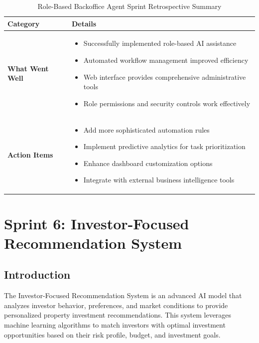 \begin{table}[htbp]
    \centering
    \begin{tabular}{|p{3cm}|p{10cm}|}
        \hline
        \textbf{Category} & \textbf{Details} \\
        \hline
        \textbf{What Went Well} & 
        \begin{itemize}
            \item Successfully implemented role-based AI assistance
            \item Automated workflow management improved efficiency
            \item Web interface provides comprehensive administrative tools
            \item Role permissions and security controls work effectively
        \end{itemize} \\
        \hline
        \textbf{Action Items} & 
        \begin{itemize}
            \item Add more sophisticated automation rules
            \item Implement predictive analytics for task prioritization
            \item Enhance dashboard customization options
            \item Integrate with external business intelligence tools
        \end{itemize} \\
        \hline
    \end{tabular}
    \caption{Role-Based Backoffice Agent Sprint Retrospective Summary}
    \label{tab:backoffice-retrospective}
\end{table}

\newpage
\section{Sprint 6: Investor-Focused Recommendation System}
\subsection*{Introduction}
The Investor-Focused Recommendation System is an advanced AI model that analyzes investor behavior, preferences, and market conditions to provide personalized property investment recommendations. This system leverages machine learning algorithms to match investors with optimal investment opportunities based on their risk profile, budget, and investment goals.

